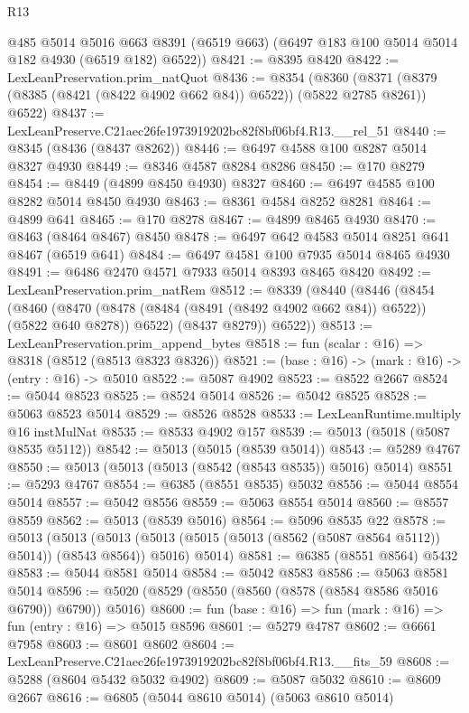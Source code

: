 \begin{lexlean}{R13}
\begin{coremodule}
      @485
      @5014
      @5016
      @663
      @8391
      (@6519 @663)
      (@6497 @183 @100 @5014 @5014 @182 @4930 (@6519 @182) @6522))
@8421 := @8395 @8420
@8422 := LexLeanPreservation.prim_natQuot
@8436 := @8354
    (@8360 (@8371 (@8379 (@8385 (@8421 (@8422 @4902 @662 @84)) @6522)) (@5822 @2785 @8261)) @6522)
@8437 := LexLeanPreserve.C21aec26fe1973919202bc82f8bf06bf4.R13.__rel_51
@8440 := @8345 (@8436 (@8437 @8262))
@8446 := @6497 @4588 @100 @8287 @5014 @8327 @4930
@8449 := @8346 @4587 @8284 @8286
@8450 := @170 @8279
@8454 := @8449 (@4899 @8450 @4930) @8327
@8460 := @6497 @4585 @100 @8282 @5014 @8450 @4930
@8463 := @8361 @4584 @8252 @8281
@8464 := @4899 @641
@8465 := @170 @8278
@8467 := @4899 @8465 @4930
@8470 := @8463 (@8464 @8467) @8450
@8478 := @6497 @642 @4583 @5014 @8251 @641 @8467 (@6519 @641)
@8484 := @6497 @4581 @100 @7935 @5014 @8465 @4930
@8491 := @6486 @2470 @4571 @7933 @5014 @8393 @8465 @8420
@8492 := LexLeanPreservation.prim_natRem
@8512 := @8339
    (@8440
      (@8446
        (@8454
          (@8460
            (@8470 (@8478 (@8484 (@8491 (@8492 @4902 @662 @84)) @6522)) (@5822 @640 @8278))
            @6522)
          (@8437 @8279))
        @6522))
@8513 := LexLeanPreservation.prim_append_bytes
@8518 := fun (scalar : @16) => @8318 (@8512 (@8513 @8323 @8326))
@8521 := (base : @16) -> (mark : @16) -> (entry : @16) -> @5010
@8522 := @5087 @4902
@8523 := @8522 @2667
@8524 := @5044 @8523
@8525 := @8524 @5014
@8526 := @5042 @8525
@8528 := @5063 @8523 @5014
@8529 := @8526 @8528
@8533 := LexLeanRuntime.multiply @16 instMulNat
@8535 := @8533 @4902 @157
@8539 := @5013 (@5018 (@5087 @8535 @5112))
@8542 := @5013 (@5015 (@8539 @5014))
@8543 := @5289 @4767
@8550 := @5013 (@5013 (@5013 (@8542 (@8543 @8535)) @5016) @5014)
@8551 := @5293 @4767
@8554 := @6385 (@8551 @8535) @5032
@8556 := @5044 @8554 @5014
@8557 := @5042 @8556
@8559 := @5063 @8554 @5014
@8560 := @8557 @8559
@8562 := @5013 (@8539 @5016)
@8564 := @5096 @8535 @22
@8578 := @5013
    (@5013
      (@5013 (@5013 (@5015 (@5013 (@8562 (@5087 @8564 @5112)) @5014)) (@8543 @8564)) @5016)
      @5014)
@8581 := @6385 (@8551 @8564) @5432
@8583 := @5044 @8581 @5014
@8584 := @5042 @8583
@8586 := @5063 @8581 @5014
@8596 := @5020 (@8529 (@8550 (@8560 (@8578 (@8584 @8586 @5016 @6790)) @6790)) @5016)
@8600 := fun (base : @16) => fun (mark : @16) => fun (entry : @16) => @5015 @8596
@8601 := @5279 @4787
@8602 := @6661 @7958
@8603 := @8601 @8602
@8604 := LexLeanPreserve.C21aec26fe1973919202bc82f8bf06bf4.R13.__fits_59
@8608 := @5288 (@8604 @5432 @5032 @4902)
@8609 := @5087 @5032
@8610 := @8609 @2667
@8616 := @6805 (@5044 @8610 @5014) (@5063 @8610 @5014)

\end{coremodule}
\end{lexlean}
